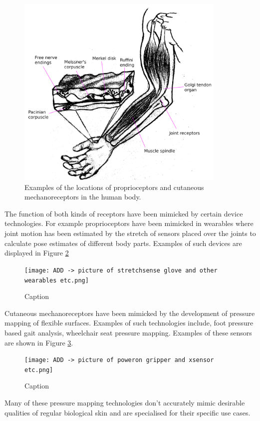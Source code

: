 \begin{figure}[h!]
    \centering
    \includegraphics[width=10cm]{Figures/propriocetors_n_cutaneous_mechanoreceptors_labelled.png}
    \caption{Examples of the locations of proprioceptors and cutaneous mechanoreceptors in the human body.}
    \label{fig:proprioceptors-mechanoreceptors}
\end{figure}

The function of both kinds of receptors have been mimicked by certain device technologies. For example proprioceptors have been mimicked in wearables where joint motion has been estimated by the stretch of sensors placed over the joints to calculate pose estimates of different body parts. Examples of such devices are displayed in Figure \ref{fig:proprio-tech}
\begin{figure}[H]
    \centering
    \texttt{[image: ADD -> picture of stretchsense glove and other wearables etc.png]}
    \caption{Caption}
    \label{fig:proprio-tech}
\end{figure}
Cutaneous mechanoreceptors have been mimicked by the development of pressure mapping of flexible surfaces. Examples of such technologies include, foot pressure based gait analysis, wheelchair seat pressure mapping. Examples of these sensors are shown in Figure \ref{fig:mechano-tech}.
\begin{figure}[H]
    \centering
    \texttt{[image: ADD -> picture of poweron gripper and xsensor etc.png]}
    \caption{Caption}
    \label{fig:mechano-tech}
\end{figure}
Many of these pressure mapping technologies don't accurately mimic desirable qualities of regular biological skin and are specialised for their specific use cases.

